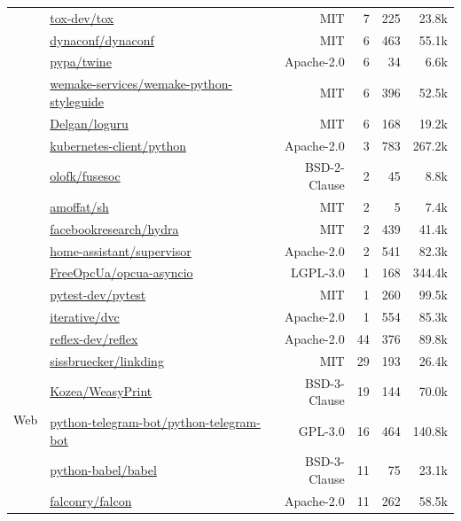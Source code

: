 {\begin{tabular}{llrrrr}
& \href{https://github.com/tox-dev/tox}{tox-dev/tox} & MIT & 7 & 225 & 23.8k \\
& \href{https://github.com/dynaconf/dynaconf}{dynaconf/dynaconf} & MIT & 6 & 463 & 55.1k \\
& \href{https://github.com/pypa/twine}{pypa/twine} & Apache-2.0 & 6 & 34 & 6.6k \\
& \href{https://github.com/wemake-services/wemake-python-styleguide}{wemake-services/wemake-python-styleguide} & MIT & 6 & 396 & 52.5k \\
& \href{https://github.com/Delgan/loguru}{Delgan/loguru} & MIT & 6 & 168 & 19.2k \\
& \href{https://github.com/kubernetes-client/python}{kubernetes-client/python} & Apache-2.0 & 3 & 783 & 267.2k \\
& \href{https://github.com/olofk/fusesoc}{olofk/fusesoc} & BSD-2-Clause & 2 & 45 & 8.8k \\
& \href{https://github.com/amoffat/sh}{amoffat/sh} & MIT & 2 & 5 & 7.4k \\
& \href{https://github.com/facebookresearch/hydra}{facebookresearch/hydra} & MIT & 2 & 439 & 41.4k \\
& \href{https://github.com/home-assistant/supervisor}{home-assistant/supervisor} & Apache-2.0 & 2 & 541 & 82.3k \\
& \href{https://github.com/FreeOpcUa/opcua-asyncio}{FreeOpcUa/opcua-asyncio} & LGPL-3.0 & 1 & 168 & 344.4k \\
& \href{https://github.com/pytest-dev/pytest}{pytest-dev/pytest} & MIT & 1 & 260 & 99.5k \\
& \href{https://github.com/iterative/dvc}{iterative/dvc} & Apache-2.0 & 1 & 554 & 85.3k \\
\midrule
\multirow{12}{*}{Web} & \href{https://github.com/reflex-dev/reflex}{reflex-dev/reflex} & Apache-2.0 & 44 & 376 & 89.8k \\
& \href{https://github.com/sissbruecker/linkding}{sissbruecker/linkding} & MIT & 29 & 193 & 26.4k \\
& \href{https://github.com/Kozea/WeasyPrint}{Kozea/WeasyPrint} & BSD-3-Clause & 19 & 144 & 70.0k \\
& \href{https://github.com/python-telegram-bot/python-telegram-bot}{python-telegram-bot/python-telegram-bot} & GPL-3.0 & 16 & 464 & 140.8k \\
& \href{https://github.com/python-babel/babel}{python-babel/babel} & BSD-3-Clause & 11 & 75 & 23.1k \\
& \href{https://github.com/falconry/falcon}{falconry/falcon} & Apache-2.0 & 11 & 262 & 58.5k \\

\end{tabular}}
